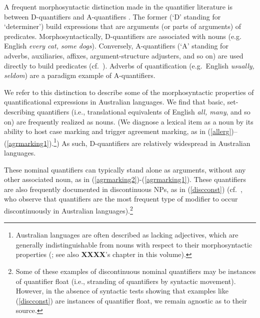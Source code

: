 \documentclass[12pt,egregdoesnotlikesansseriftitles]{scrartcl}
\begin{document}

A frequent morphosyntactic distinction made in the quantifier literature is between D-quantifiers and A-quantifiers \citep{partee95}. %
The former (`D' standing for `determiner') build expressions that are arguments (or parts of arguments) of predicates.  Morphosyntactically, D-quantifiers are associated with nouns (e.g. English \textit{every cat, some dogs}). Conversely, A-quantifiers (`A' standing for adverbs, auxiliaries, affixes, argument-structure adjusters, and so on) are used directly to build predicates (cf.\ \citealt{keenan17qu}). Adverbs of quantification (e.g.\ English \textit{usually, seldom}) are a paradigm example of A-quantifiers.

We refer to this distinction to describe some of the morphosyntactic properties of quantificational expressions in Australian languages. We find that basic, set-describing quantifiers (i.e., translational equivalents of English \textit{all, many}, and so on) are frequently realized as nouns. (We diagnose a lexical item as a noun by its ability to host case marking and trigger agreement marking, as in (\ref{allerg})--(\ref{agrmarking1}).\footnote{Australian languages are often described as lacking adjectives, which are generally indistinguishable from nouns with respect to their morphosyntactic properties (\citealt[67--68]{dixon02}; see also \textbf{XXXX}'s chapter in this volume).}) As such, D-quantifiers are relatively widespread in Australian languages.

These nominal quantifiers can typically stand alone as arguments, without any other associated noun, as in (\ref{agrmarking2})-(\ref{agrmarking1}). These quantifiers are also frequently documented in discontinuous NPs, as in (\ref{discconst}) (cf.\ \citealt[51--52]{louagieverstraete16}, who observe that quantifiers are the most frequent type of modifier to occur discontinuously in Australian languages).\footnote{Some of these examples of discontinuous nominal quantifiers may be instances of quantifier float (i.e., stranding of quantifiers by syntactic movement). However, in the absence of syntactic tests showing that examples like (\ref{discconst}) are instances of quantifier float, we remain agnostic as to their source.}
\end{document}
